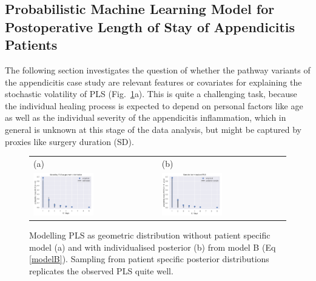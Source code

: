 \subsection{Probabilistic Machine Learning Model for Postoperative Length of Stay of Appendicitis Patients}
\label{sec:ML}
The following section investigates the question of whether the pathway
variants of the appendicitis case study are relevant features or
covariates for explaining the stochastic volatility of PLS (Fig.~\ref{fig:Geom}a).
This is quite a challenging task, because the individual healing process is expected to depend on personal factors like age \cite{polanczyk2001impact} as well as the individual severity of the appendicitis inflammation, which in general is unknown at this stage of the data analysis, but might be captured by proxies like surgery duration (SD).

\begin{figure}
  \centering
  \begin{tabular}{ll}
    (a) & (b) \\
    \includegraphics[width=0.5\textwidth]{images/DS19eH1_G0__empirical_geometric.pdf}
    &
    \includegraphics[width=0.5\textwidth]{images/DS19fk1_c0__sampled_posterior.pdf}\\
  \end{tabular}
    \caption{Modelling PLS as geometric distribution without patient
      specific model (a) and with individualised posterior (b) from
      model B (Eq \eqref{modelB}). Sampling from patient specific
      posterior distributions replicates the observed PLS quite well.
      }
    \label{fig:Geom}
\end{figure}

